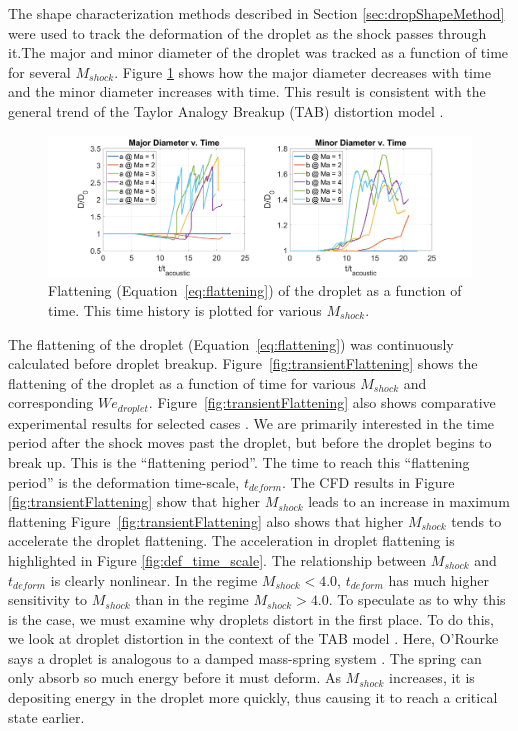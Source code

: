\documentclass{UCF_ETD}
\begin{document}
The shape characterization methods described in Section \ref{sec:dropShapeMethod} were used to track the deformation of the droplet as the shock passes through it.The major and minor diameter of the droplet was tracked as a function of time for several $M_{shock}$.
Figure \ref{fig:diameters_v_time} shows how the major diameter decreases with time and the minor diameter increases with time. This result is consistent with the general trend of the Taylor Analogy Breakup (TAB) distortion model \cite{TAB_model}. 

\begin{figure}
\centering
\includegraphics[width=\linewidth]{Figures/Diameters_v_time.png}
\caption{Flattening (Equation~\ref{eq:flattening}) of the droplet as a function of time. This time history is plotted for various $M_{shock}$.}
\label{fig:diameters_v_time}
\end{figure}


The flattening of the droplet (Equation~\ref{eq:flattening}) was continuously calculated before droplet breakup.
Figure~\ref{fig:transientFlattening} shows the flattening of the droplet as a function of time for various $M_{shock}$ and corresponding $We_{droplet}$.
Figure~\ref{fig:transientFlattening} also shows comparative experimental results for selected cases \cite{Briggs2024}. 
We are primarily interested in the time period after the shock moves past the droplet, but before the droplet begins to break up. This is the ``flattening period''.
The time to reach this ``flattening period'' is the deformation time-scale, $t_{deform}$.
The CFD results in Figure \ref{fig:transientFlattening} show that higher $M_{shock}$ leads to an increase in maximum flattening
Figure~\ref{fig:transientFlattening} also shows that higher $M_{shock}$ tends to accelerate the droplet flattening. 
The acceleration in droplet flattening is highlighted in Figure \ref{fig:def_time_scale}.
The relationship between $M_{shock}$ and $t_{deform}$ is clearly nonlinear. In the regime $M_{shock} < 4.0$, $t_{deform}$ has much higher sensitivity to $M_{shock}$ than in the regime $M_{shock} > 4.0$.
To speculate as to why this is the case, we must examine why droplets distort in the first place. 
To do this, we look at droplet distortion in the context of the TAB model \cite{TAB_model}.
Here, O'Rourke says a droplet is analogous to a damped mass-spring system \cite{TAB_model}.
The spring can only absorb so much energy before it must deform.
As $M_{shock}$ increases, it is depositing energy in the droplet more quickly, thus causing it to reach a critical state earlier.
\end{document}
